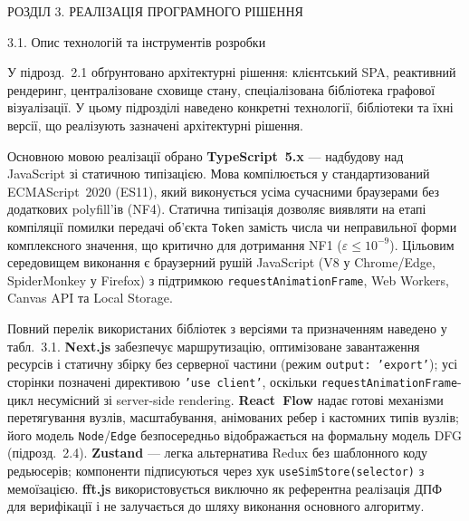 
\protect{}\label{_Toc229681122}{}РОЗДІЛ 3. РЕАЛІЗАЦІЯ
ПРОГРАМНОГО РІШЕННЯ

\protect{}\label{_Toc229681123}{}3.1. Опис технологій та
інструментів розробки

У підрозд.~2.1 обґрунтовано архітектурні рішення: клієнтський SPA,
реактивний рендеринг, централізоване сховище стану, спеціалізована
бібліотека графової візуалізації. У цьому підрозділі наведено конкретні
технології, бібліотеки та їхні версії, що реалізують зазначені
архітектурні рішення.

Основною мовою реалізації обрано \textbf{TypeScript~5.x} --- надбудову
над JavaScript зі статичною типізацією. Мова компілюється у
стандартизований ECMAScript~2020 (ES11), який виконується усіма сучасними
браузерами без додаткових polyfill'ів (NF4). Статична типізація дозволяє
виявляти на етапі компіляції помилки передачі об'єкта \texttt{Token}
замість числа чи неправильної форми комплексного значення, що критично для
дотримання NF1 (\(\varepsilon\leq10^{-9}\)). Цільовим середовищем
виконання є браузерний рушій JavaScript (V8 у Chrome/Edge, SpiderMonkey у
Firefox) з підтримкою \texttt{requestAnimationFrame}, Web Workers,
Canvas API та Local Storage.

Повний перелік використаних бібліотек з версіями та призначенням наведено
у табл.~3.1. \textbf{Next.js} забезпечує маршрутизацію, оптимізоване
завантаження ресурсів і статичну збірку без серверної частини (режим
\texttt{output: 'export'}); усі сторінки позначені директивою
\texttt{'use client'}, оскільки \texttt{requestAnimationFrame}-цикл
несумісний зі server-side rendering. \textbf{React~Flow} надає готові
механізми перетягування вузлів, масштабування, анімованих ребер і
кастомних типів вузлів; його модель \texttt{Node}/\texttt{Edge}
безпосередньо відображається на формальну модель DFG (підрозд.~2.4).
\textbf{Zustand} --- легка альтернатива Redux без шаблонного коду
редьюсерів; компоненти підписуються через хук
\texttt{useSimStore(selector)} з мемоїзацією. \textbf{fft.js}
використовується виключно як референтна реалізація ДПФ для верифікації і
не залучається до шляху виконання основного алгоритму.

